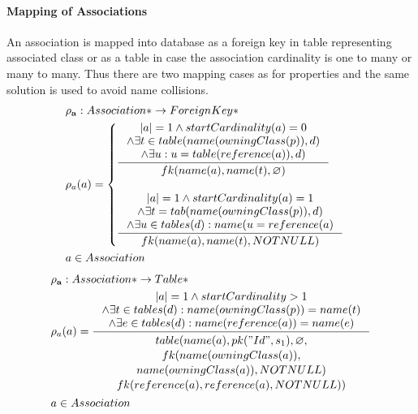 \documentclass[11pt]{article}
\begin{document}
\paragraph{Mapping of Associations} An association is mapped into database as a foreign key in table representing associated class or as a table in case the association cardinality is one to many or many to many. Thus there are two mapping cases as for properties and the same solution is used to avoid name collisions.
\begin{align*}
&	\mathbf{\rho_a} : Association* \rightarrow ForeignKey* \\
&	\rho_a(a) = \begin{cases}
		\inference{|a| = 1 \wedge  startCardinality(a) = 0 \\ \wedge \exists t \in table(name(owningClass(p)), d) \\ \wedge \exists u : u = table(reference(a)), d)
		}{
			fk(name(a), name(t),  \varnothing) 
	 	}
  \\ \\
 	 \inference{|a| = 1 \wedge  startCardinality(a) = 1 \\ \wedge \exists t = tab(name(owningClass(p)), d) \\ \wedge \exists u \in tables(d) : name(u = reference(a)
 	 }{ 
		fk(name(a), name(t),  NOTNULL)
	}	 \end{cases}
\\
&	 a \in Association
\end{align*}
\begin{align*} 
&	\mathbf{\rho_a} : Association* \rightarrow Table* \\
&	\rho_a(a) =
		\inference{|a| = 1 \wedge   startCardinality > 1 \\ \wedge \exists t \in tables(d) : name(owningClass(p)) = name(t) \\ \wedge \exists e \in tables(d) : name(reference(a)) = name(e)
  		}{\begin{gathered}  
		 table(name(a), pk("Id", s_1), \varnothing, \\ fk(name(owningClass(a)), \\ name(owningClass(a)), NOTNULL) \\ fk(reference(a), reference(a), NOTNULL)) 
  		\end{gathered}}  
\\
&	 a \in Association
\end{align*}
\end{document}
